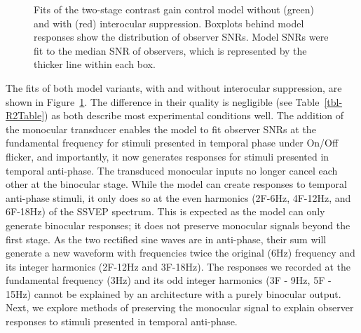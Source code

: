 \documentclass[
  12pt,
]{article}
\begin{document}
\begin{figure}


\caption{\label{fig-betterModels}Fits of the two-stage contrast gain
control model without (green) and with (red) interocular suppression.
Boxplots behind model responses show the distribution of observer SNRs.
Model SNRs were fit to the median SNR of observers, which is represented
by the thicker line within each box.}

\end{figure}%

The fits of both model variants, with and without interocular
suppression, are shown in Figure~\ref{fig-betterModels}. The difference
in their quality is negligible (see Table~\ref{tbl-R2Table}) as both
describe most experimental conditions well. The addition of the
monocular transducer enables the model to fit observer SNRs at the
fundamental frequency for stimuli presented in temporal phase under
On/Off flicker, and importantly, it now generates responses for stimuli
presented in temporal anti-phase. The transduced monocular inputs no
longer cancel each other at the binocular stage. While the model can
create responses to temporal anti-phase stimuli, it only does so at the
even harmonics (2F-6Hz, 4F-12Hz, and 6F-18Hz) of the SSVEP spectrum.
This is expected as the model can only generate binocular responses; it
does not preserve monocular signals beyond the first stage. As the two
rectified sine waves are in anti-phase, their sum will generate a new
waveform with frequencies twice the original (6Hz) frequency and its
integer harmonics (2F-12Hz and 3F-18Hz). The responses we recorded at
the fundamental frequency (3Hz) and its odd integer harmonics (3F - 9Hz,
5F - 15Hz) cannot be explained by an architecture with a purely
binocular output. Next, we explore methods of preserving the monocular
signal to explain observer responses to stimuli presented in temporal
anti-phase.
\end{document}
